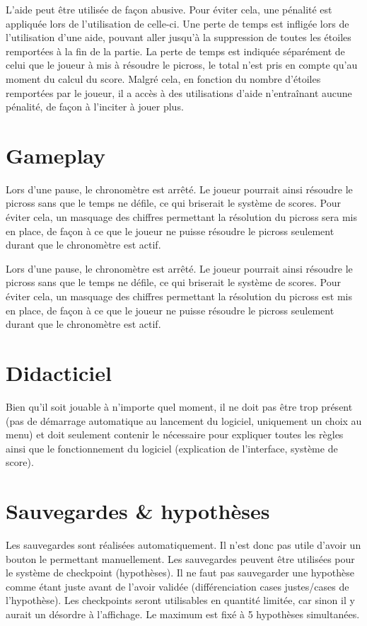 \documentclass{report}
\begin{document}
		L'aide peut être utilisée de façon abusive. Pour éviter cela, une pénalité est appliquée lors de l'utilisation de celle-ci. Une perte de temps est infligée lors de l'utilisation d'une aide, pouvant aller jusqu'à la suppression de toutes les étoiles remportées à la fin de la partie. La perte de temps est indiquée séparément de celui que le joueur à mis à résoudre le picross, le total n'est pris en compte qu'au moment du calcul du score. Malgré cela, en fonction du nombre d'étoiles remportées par le joueur, il a accès à des utilisations d'aide n'entraînant aucune pénalité, de façon à l'inciter à jouer plus.
	
	\section{Gameplay}
		Lors d'une pause, le chronomètre est arrêté. Le joueur pourrait ainsi résoudre le picross sans que le temps ne défile, ce qui briserait le système de scores. Pour éviter cela, un masquage des chiffres permettant la résolution du picross sera mis en place, de façon à ce que le joueur ne puisse résoudre le picross seulement durant que le chronomètre est actif.

		Lors d'une pause, le chronomètre est arrêté. Le joueur pourrait ainsi résoudre le picross sans que le temps ne défile, ce qui briserait le système de scores. Pour éviter cela, un masquage des chiffres permettant la résolution du picross est mis en place, de façon à ce que le joueur ne puisse résoudre le picross seulement durant que le chronomètre est actif.
		
	\section{Didacticiel}
		Bien qu'il soit jouable à n'importe quel moment, il ne doit pas être trop présent (pas de démarrage automatique au lancement du logiciel, uniquement un choix au menu) et doit seulement contenir le nécessaire pour expliquer toutes les règles ainsi que le fonctionnement du logiciel (explication de l'interface, système de score).
	
	\section{Sauvegardes \& hypothèses}
		Les sauvegardes sont réalisées automatiquement. Il n'est donc pas utile d'avoir un bouton le permettant manuellement. Les sauvegardes peuvent être utilisées pour le système de checkpoint (hypothèses). Il ne faut pas sauvegarder une hypothèse comme étant juste avant de l'avoir validée (différenciation cases justes/cases de l'hypothèse). Les checkpoints seront utilisables en quantité limitée, car sinon il y aurait un désordre à l'affichage. Le maximum est fixé à 5 hypothèses simultanées.
		
\end{document}
